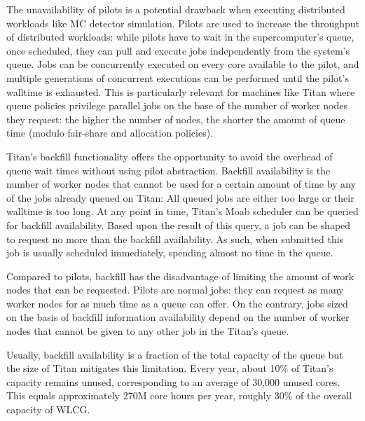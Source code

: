 The unavailability of pilots is a potential drawback when executing distributed
workloads like MC detector simulation. Pilots are used to increase the
throughput of distributed workloads: while pilots have to wait in the
supercomputer's queue, once scheduled, they can pull and execute jobs
independently from the system's queue. Jobs can be concurrently executed on
every core available to the pilot, and multiple generations of concurrent
executions can be performed until the pilot's walltime is exhausted. This is
particularly relevant for machines like Titan where queue policies privilege
parallel jobs on the base of the number of worker nodes they request: the higher
the number of nodes, the shorter the amount of queue time (modulo fair-share and
allocation policies).


Titan’s backfill functionality offers the opportunity to avoid the overhead of
queue wait times without using pilot abstraction. Backfill availability is the
number of worker nodes that cannot be used for a certain amount of time by any
of the jobs already queued on Titan: All queued jobs are either too large or
their walltime is too long. At any point in time, Titan’s Moab scheduler can be
queried for backfill availability. Based upon the result of this query, a job
can be shaped to request no more than the backfill availability. As such, when
submitted this job is usually scheduled immediately, spending almost no time in
the queue.

Compared to pilots, backfill has the disadvantage of limiting the amount of work
nodes that can be requested. Pilots are normal jobs: they can request as many
worker nodes for as much time as a queue can offer. On the contrary, jobs sized
on the basis of backfill information availability  depend on the number of worker nodes that cannot be given to
any other job in the Titan's queue.

Usually, backfill availability is a fraction of the total capacity of the queue
but the size of Titan mitigates this limitation. Every year, about 10\% of
Titan's capacity remains unused, corresponding to an average of 30,000 unused
cores. This equals approximately 270M core hours per year, roughly 30\% of the
overall capacity of WLCG.

